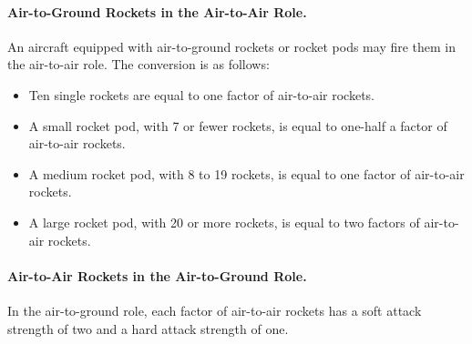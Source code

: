 \begin{advancedrules}
{}{

\paragraph{Air-to-Ground Rockets in the Air-to-Air Role.} An aircraft equipped with air-to-ground rockets or rocket pods may fire them in the air-to-air role. The conversion is as follows:

\begin{itemize}
    \item Ten single rockets are equal to one factor of air-to-air rockets.	
    \item A small rocket pod, with 7 or fewer rockets, is equal to one-half a factor of air-to-air rockets.
    \item A medium rocket pod, with 8 to 19 rockets, is equal to one factor of air-to-air rockets.
    \item A large rocket pod, with 20 or more rockets, is equal to two factors of air-to-air rockets.
\end{itemize}

\paragraph{Air-to-Air Rockets in the Air-to-Ground Role.} In the air-to-ground role, each factor of air-to-air rockets has a soft attack strength of two and a hard attack strength of one.
}




\CX{
}
\end{advancedrules}
